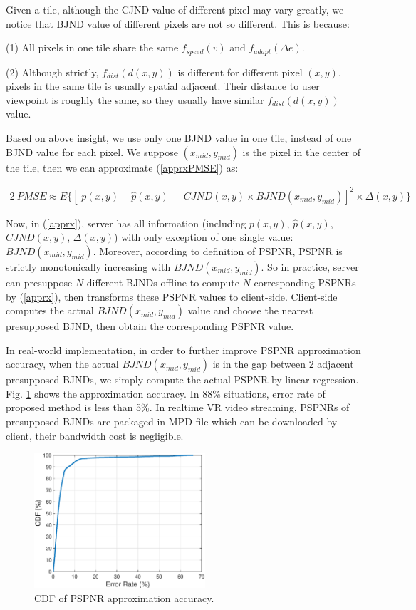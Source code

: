 Given a tile, although the CJND value of different pixel may vary greatly, we notice that BJND value of different pixels are not so different. This is because:

 (1) All pixels in one tile share the same $f_{speed}(v)$ and $f_{adapt}(\Delta e)$. 
 
 (2) Although strictly, $f_{dist}(d(x, y))$ is different for different pixel $(x, y)$, pixels in the same tile is usually spatial adjacent. Their distance to user viewpoint is roughly the same, so they usually have similar $f_{dist}(d(x, y))$ value.

Based on above insight, we use only one BJND value in one tile, instead of one BJND value for each pixel. We suppose $(x_{mid}, y_{mid})$ is the pixel in the center of the tile, then we can approximate (\ref{apprxPMSE}) as:

\begin{alignat}{2}\
PMSE \approx E\{ \left[ |p(x, y) - \hat{p}(x, y)| - CJND(x, y) \times BJND(x_{mid}, y_{mid})\right]^2 \times \Delta (x, y)\} \label{apprx}
\end{alignat} 

Now, in (\ref{apprx}), server has all information (including $p(x, y)$, $\hat{p}(x, y)$, $CJND(x, y)$, $\Delta (x, y)$) with only exception of one single value: $BJND(x_{mid}, y_{mid})$. Moreover, according to definition of PSPNR, PSPNR is strictly monotonically increasing with $BJND(x_{mid}, y_{mid})$. So in practice, server can presuppose $N$ different BJNDs offline to compute $N$ corresponding PSPNRs by (\ref{apprx}), then transforms these PSPNR values to client-side. Client-side computes the actual $BJND(x_{mid}, y_{mid})$ value and choose the nearest presupposed BJND, then obtain the corresponding PSPNR value.

In real-world implementation, in order to further improve PSPNR approximation accuracy, when the actual $BJND(x_{mid}, y_{mid})$ is in the gap between 2 adjacent presupposed BJNDs, we simply compute the actual PSPNR by linear regression. Fig. \ref{PSPNR_computation} shows the approximation accuracy. In 88\% situations, error rate of proposed method is less than 5\%. In realtime VR video streaming, PSPNRs of presupposed BJNDs are packaged in MPD file which can be downloaded by client, their bandwidth cost is negligible.

\begin{figure}
  \centering
  \includegraphics[width=2.5in]{images/PSPNR_computation.eps}
  \caption{CDF of PSPNR approximation accuracy.}
  \label{PSPNR_computation}
  \end{figure}

